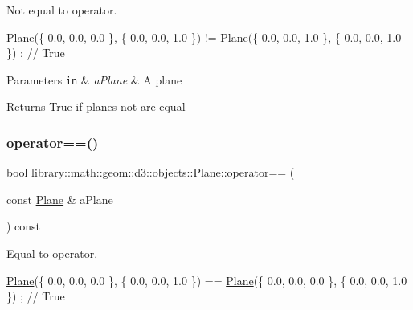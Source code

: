 Not equal to operator. 


\begin{DoxyCode}
\hyperlink{classlibrary_1_1math_1_1geom_1_1d3_1_1objects_1_1_plane_a81fe78a983e2cb6ee6ad9bfabd22c3a4}{Plane}(\{ 0.0, 0.0, 0.0 \}, \{ 0.0, 0.0, 1.0 \}) != \hyperlink{classlibrary_1_1math_1_1geom_1_1d3_1_1objects_1_1_plane_a81fe78a983e2cb6ee6ad9bfabd22c3a4}{Plane}(\{ 0.0, 0.0, 1.0 \}, \{ 0.0, 0.0, 1.0 \}) ; \textcolor{comment}{//
       True}
\end{DoxyCode}



\begin{DoxyParams}[1]{Parameters}
\mbox{\tt in}  & {\em a\+Plane} & A plane \\
\hline
\end{DoxyParams}
\begin{DoxyReturn}{Returns}
True if planes not are equal 
\end{DoxyReturn}
\mbox{\label{classlibrary_1_1math_1_1geom_1_1d3_1_1objects_1_1_plane_a9391589825cac1db971b39452b38f8ea}} 
\subsubsection{\texorpdfstring{operator==()}{operator==()}}
{\footnotesize\ttfamily bool library\+::math\+::geom\+::d3\+::objects\+::\+Plane\+::operator== (\begin{DoxyParamCaption}\item[{const \hyperlink{classlibrary_1_1math_1_1geom_1_1d3_1_1objects_1_1_plane}{Plane} \&}]{a\+Plane }\end{DoxyParamCaption}) const}



Equal to operator. 


\begin{DoxyCode}
\hyperlink{classlibrary_1_1math_1_1geom_1_1d3_1_1objects_1_1_plane_a81fe78a983e2cb6ee6ad9bfabd22c3a4}{Plane}(\{ 0.0, 0.0, 0.0 \}, \{ 0.0, 0.0, 1.0 \}) == \hyperlink{classlibrary_1_1math_1_1geom_1_1d3_1_1objects_1_1_plane_a81fe78a983e2cb6ee6ad9bfabd22c3a4}{Plane}(\{ 0.0, 0.0, 0.0 \}, \{ 0.0, 0.0, 1.0 \}) ; \textcolor{comment}{//
       True}
\end{DoxyCode}



